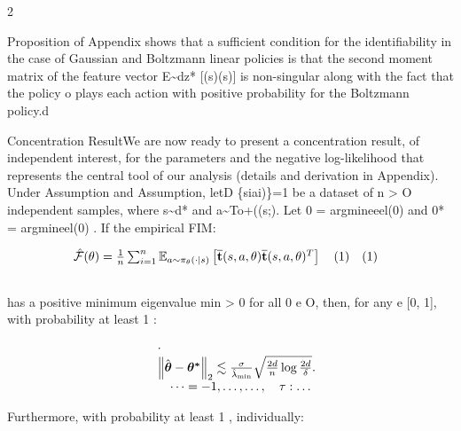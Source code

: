 \documentclass{article}
\begin{document}
\sloppy

\begin{paracol}{2}
\RaggedRight

Proposition of Appendix shows that a sufficient condition
for the identifiability in the case of Gaussian and Boltzmann
linear policies is that the second moment matrix of the feature vector E\textasciitilde{}dz* [(s)(s)] is non-singular along with
the fact that the policy o plays each action with positive
probability for the Boltzmann policy.d


Concentration ResultWe are now ready to present a concentration result, of independent interest, for the parameters
and the negative log-likelihood that represents the central
tool of our analysis (details and derivation in Appendix).
Under Assumption and Assumption, letD
\{siai)\}=1 be a dataset of n > O independent samples, where s\textasciitilde{}d* and a\textasciitilde{}To+((s;). Let
0 = argmineeel(0) and 0* = argmineel(0) . If
the empirical FIM:


\begin{equation}
\begin{array} { r l } { \hat { \mathcal { F } } ( \theta ) = \frac { 1 } { n } \sum _ { i = 1 } ^ { n } \mathbb { E } _ { a \sim \pi _ { \theta } ( \cdot | s ) } \left [ \overline { \mathbf { t } } ( s, a, \theta ) \overline { \mathbf { t } } ( s, a, \theta ) ^ { T } \right ] \quad ( 1 ) } & { ( 1 ) } \\ & { \qquad }\end{array}
\end{equation}


has a positive minimum eigenvalue min > 0 for all 0 e O,
then, for any  e [0, 1], with probability at least 1  :


\begin{equation}
\begin{array} { r l } & { \cdot } \\ & { \left \| \hat { \boldsymbol { \theta } } - \boldsymbol { \theta ^ { * } } \right \| _ { 2 } \lesssim \frac { \sigma } { \hat { \lambda } _ { \operatorname* { m i n } } } \sqrt { \frac { 2 d } { n } \log \frac { 2 d } { \delta } }. } \\ & { \quad \dots = - 1, \dots, \dots, \quad \tau : \dots } \end{array}
\end{equation}


Furthermore, with probability at least 1  , individually:



\end{paracol}
\end{document}

